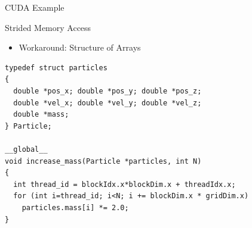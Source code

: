 
\begin{frame}[fragile]{CUDA Example}

\begin{block}{Strided Memory Access}
  \begin{itemize}
   \item Workaround: Structure of Arrays
  \end{itemize}
  \begin{lstlisting}  
typedef struct particles
{
  double *pos_x; double *pos_y; double *pos_z;
  double *vel_x; double *vel_y; double *vel_z;
  double *mass;
} Particle;
  
__global__ 
void increase_mass(Particle *particles, int N)
{
  int thread_id = blockIdx.x*blockDim.x + threadIdx.x;
  for (int i=thread_id; i<N; i += blockDim.x * gridDim.x)
    particles.mass[i] *= 2.0;
}  
  \end{lstlisting}
\end{block}

\end{frame}

